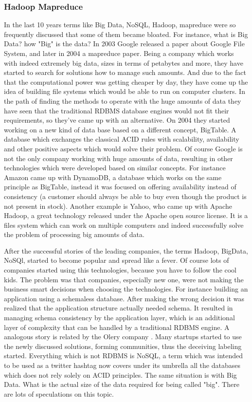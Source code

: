 \subsubsection{Hadoop Mapreduce}
In the last 10 years terms like Big Data, NoSQL, Hadoop, mapreduce were so frequently discussed that some of them became bloated. For instance, what is Big Data? how "Big" is the data? In 2003 Google released a paper about Google File System, and later in 2004 a mapreduce paper. Being a company which works with indeed extremely big data, sizes in terms of petabytes and more, they have started to search for solutions how to manage such amounts. And due to the fact that the computational power was getting cheaper by day, they have come up the idea of building file systems which would be able to run on computer clusters. In the path of finding the methods to operate with the huge amounts of data they have seen that the traditional RDBMS database engines would not fit their requirements, so they've came up with an alternative. On 2004 they started working on a new kind of data base based on a different concept, BigTable. A database which exchanges the classical ACID rules with scalability, availability and other positive aspects which would solve their problem. Of course Google is not the only company working with huge amounts of data, resulting in other technologies which were developed based on similar concepts. For instance Amazon came up with DynamoDB, a database which works on the same principle as BigTable, instead it was focused on offering availability instead of consistency (a customer should always be able to buy even though the product is not present in stock). Another example is Yahoo, who came up with Apache Hadoop, a great technology released under the Apache open source license. It is a files system which can work on multiple computers and indeed successfully solve the problem of processing big amounts of data.

After the successful stories of the leading companies, the terms Hadoop, BigData, NoSQl, started to become popular and spread like a fever. Of course lots of companies started using this technologies, because you have to follow the cool kids. The problem was that companies, especially new one, were not making the business smart decisions when choosing the technologies. For instance building an application using a schemaless database. After making the wrong decision it was realized that the application structure actually needed schema. It resulted in managing schema consistency by the application layer, which is an additional layer of complexity that can be handled by a traditional RDBMS engine. A analogous story is related by the Olery company \cite{mongo_to_postgres}. Many startups started to use the newly discussed solutions, forming communities, thus the deceiving labeling started. Everything which is not RDBMS is NoSQL, a term which was intended to be used as a twitter hashtag now covers under its umbrella all the databases which does not rely solely on ACID principles. The same situation is with Big Data. What is the actual size of the data required for being called "big". There are lots of speculations on this topic.

